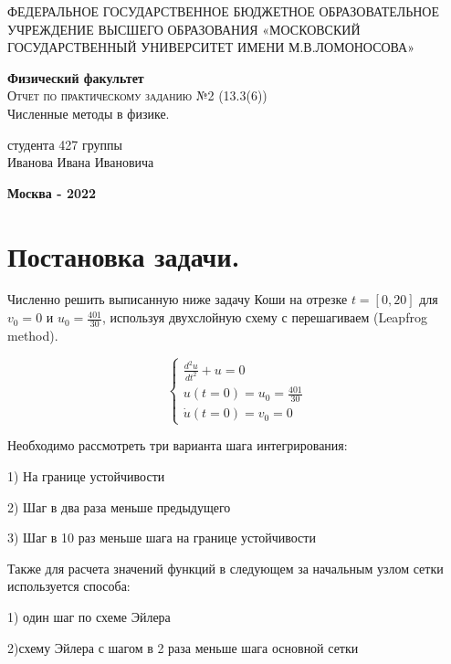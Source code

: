 \documentclass[diploma]{nanolab2015}
\begin{document}
\begin{titlepage}
\begin{center}
    \large
    ФЕДЕРАЛЬНОЕ ГОСУДАРСТВЕННОЕ БЮДЖЕТНОЕ ОБРАЗОВАТЕЛЬНОЕ УЧРЕЖДЕНИЕ ВЫСШЕГО ОБРАЗОВАНИЯ «МОСКОВСКИЙ ГОСУДАРСТВЕННЫЙ УНИВЕРСИТЕТ ИМЕНИ М.В.ЛОМОНОСОВА»
     
    \textbf{Физический факультет}\\
    \vspace{4cm}
    \textsc{\Large Отчет по практическому заданию №2 (13.3(6))}\\[5mm]
    {\LARGE Численные методы в физике.}
\end{center}
\vspace{7cm}
\null
\begin{flushright}
\normalsize студента 427 группы
\\Иванова Ивана Ивановича
\end{flushright}
\vfill
\begin{center}
\textbf{Москва - 2022}
\end{center}
\end{titlepage}

\section{Постановка задачи.}
Численно решить выписанную ниже задачу Коши  на отрезке $t= [0, 20]$ для $v_0= 0$ и $u_0 = \frac{401}{30}$,  используя двухслойную схему с перешагиваем (Leapfrog method).

\begin{equation*}
\begin{cases}
   \frac{d^2 u}{d t^2} + u = 0\\
   u(t=0)=u_0 = \frac{401}{30}\\
   \dot u(t=0)= v_0 =0
 \end{cases}
\end{equation*}

Необходимо рассмотреть три варианта шага интегрирования:

1) На границе устойчивости

2) Шаг в два раза меньше предыдущего

3) Шаг в 10 раз меньше шага на границе устойчивости

Также для расчета значений функций в следующем за начальным узлом сетки используется способа:

 1) один шаг по схеме Эйлера 
 
 2)схему Эйлера с шагом в 2 раза меньше шага основной сетки  
 
\end{document}
